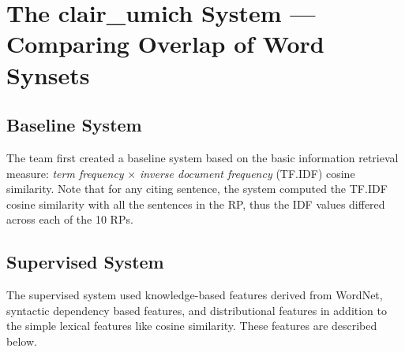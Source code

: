 \documentclass[11pt]{article}
\begin{document}

\section{The clair\_umich System --- Comparing Overlap of Word Synsets}
\label{s:umich}

\subsection{Baseline System}


The team first created a baseline system based on the basic
information retrieval measure: {\it term frequency} $\times$ {\it
  inverse document frequency} (TF.IDF) cosine similarity. Note that
for any citing sentence, the system computed the TF.IDF cosine
similarity with all the sentences in the RP, thus the IDF values
differed across each of the 10 RPs.

\subsection{Supervised System}
The supervised system used knowledge-based features derived from WordNet, syntactic dependency based features, and distributional features in addition to the simple lexical features like cosine similarity. These features are described below.
\end{document}
